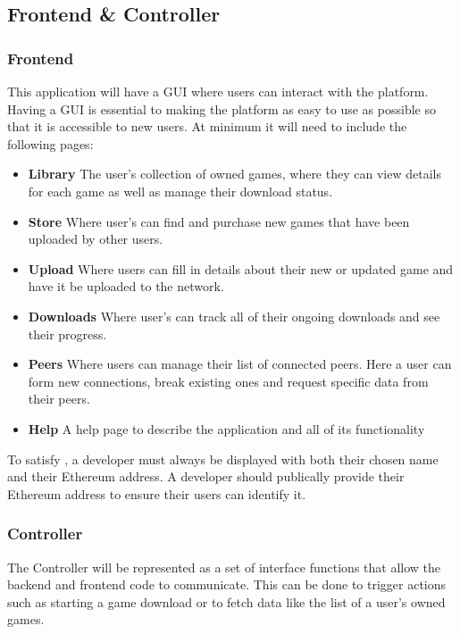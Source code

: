 \subsection*{Frontend \& Controller}

\subsubsection{Frontend}\label{subsubsec:frontend}

This application will have a GUI   where users can interact with the platform. Having a GUI is essential to making the platform as easy to use as possible so that it is accessible to new users. At minimum it will need to include the following pages:

\begin{itemize}
  \item \textbf{Library} The user's collection of owned games, where they can view details for each game as well as manage their download status.
  \item \textbf{Store} Where user's can find and purchase new games that have been uploaded by other users.
  \item \textbf{Upload} Where users can fill in details about their new or updated game and have it be uploaded to the network.
  \item \textbf{Downloads} Where user's can track all of their ongoing downloads and see their progress.
  \item \textbf{Peers} Where users can manage their list of connected peers. Here a user can form new connections, break existing ones and request specific data from their peers.
  \item \textbf{Help} A help page to describe the application and all of its functionality 
\end{itemize}

\newparagraph
To satisfy , a developer must always be displayed with both their chosen name and their Ethereum address. A developer should publically provide their Ethereum address to ensure their users can identify it.

\subsubsection{Controller}

The Controller will be represented as a set of interface functions that allow the backend and frontend code to communicate. This can be done to trigger actions such as starting a game download or to fetch data like the list of a user's owned games.
